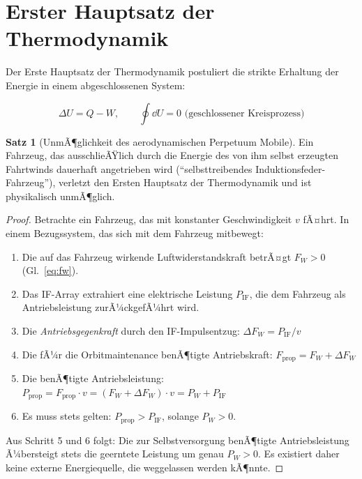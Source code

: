 ﻿\documentclass[12pt, a4paper]{report}
\theoremstyle{definition}
\newtheorem{theorem}{Satz}[section]
\theoremstyle{remark}
\begin{document}
\section{Erster Hauptsatz der Thermodynamik}

Der Erste Hauptsatz der Thermodynamik postuliert die strikte Erhaltung der
Energie in einem abgeschlossenen System:

\begin{equation}
  \Delta U = Q - W, \qquad \oint \dd U = 0 \text{ (geschlossener Kreisprozess)}
  \label{eq:1hs}
\end{equation}

\begin{theorem}[UnmÃ¶glichkeit des aerodynamischen Perpetuum Mobile]
  \label{thm:pm}
  Ein Fahrzeug, das ausschlieÃŸlich durch die Energie des von ihm selbst
  erzeugten Fahrtwinds dauerhaft angetrieben wird (``selbsttreibendes
  Induktionsfeder-Fahrzeug''), verletzt den Ersten Hauptsatz der
  Thermodynamik und ist physikalisch unmÃ¶glich.
\end{theorem}

\begin{proof}
  Betrachte ein Fahrzeug, das mit konstanter Geschwindigkeit $v$ fÃ¤hrt.
  In einem Bezugssystem, das sich mit dem Fahrzeug mitbewegt:

  \begin{enumerate}
    \item Die auf das Fahrzeug wirkende Luftwiderstandskraft betrÃ¤gt $F_W > 0$
          (Gl.~\eqref{eq:fw}).
    \item Das IF-Array extrahiert eine elektrische Leistung $P_{\text{IF}}$,
          die dem Fahrzeug als Antriebsleistung zurÃ¼ckgefÃ¼hrt wird.
    \item Die \emph{Antriebs\-gegenkraft} durch den IF-Impulsentzug:
          $\Delta F_W = P_{\text{IF}}/v$
    \item Die fÃ¼r die Orbitmaintenance benÃ¶tigte Antriebskraft:
          $F_{\text{prop}} = F_W + \Delta F_W$
    \item Die benÃ¶tigte Antriebsleistung:
          $P_{\text{prop}} = F_{\text{prop}} \cdot v = (F_W + \Delta F_W) \cdot v
          = P_W + P_{\text{IF}}$
    \item Es muss stets gelten: $P_{\text{prop}} > P_{\text{IF}}$,
          solange $P_W > 0$.
  \end{enumerate}

  Aus Schritt 5 und 6 folgt: Die zur Selbstversorgung benÃ¶tigte Antriebsleistung
  Ã¼bersteigt stets die geerntete Leistung um genau $P_W > 0$. Es existiert
  daher keine externe Energiequelle, die weggelassen werden kÃ¶nnte. 
\end{proof}
\end{document}
